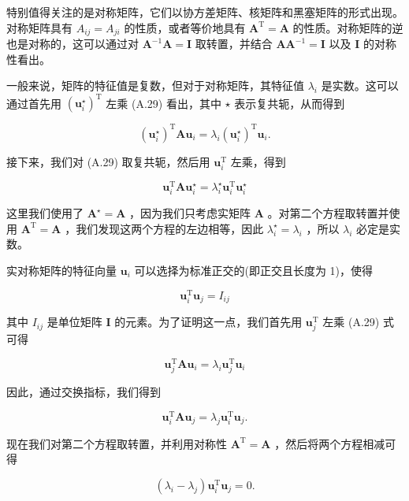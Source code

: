 \documentclass[10pt]{article}
\begin{document}
特别值得关注的是对称矩阵，它们以协方差矩阵、核矩阵和黑塞矩阵的形式出现。对称矩阵具有 \({A}_{ij} = {A}_{ji}\) 的性质，或者等价地具有 \({\mathbf{A}}^{\mathrm{T}} = \mathbf{A}\) 的性质。对称矩阵的逆也是对称的，这可以通过对 \({\mathbf{A}}^{-1}\mathbf{A} = \mathbf{I}\) 取转置，并结合 \(\mathbf{A}{\mathbf{A}}^{-1} = \mathbf{I}\) 以及 \(\mathbf{I}\) 的对称性看出。

一般来说，矩阵的特征值是复数，但对于对称矩阵，其特征值 \({\lambda }_{i}\) 是实数。这可以通过首先用 \({\left( {\mathbf{u}}_{i}^{ \star  }\right) }^{\mathrm{T}}\) 左乘 (A.29) 看出，其中 \(\star\) 表示复共轭，从而得到

\[
{\left( {\mathbf{u}}_{i}^{ \star  }\right) }^{\mathrm{T}}\mathbf{A}{\mathbf{u}}_{i} = {\lambda }_{i}{\left( {\mathbf{u}}_{i}^{ \star  }\right) }^{\mathrm{T}}{\mathbf{u}}_{i}. \tag{A.31}
\]

接下来，我们对 (A.29) 取复共轭，然后用 \({\mathbf{u}}_{i}^{\mathrm{T}}\) 左乘，得到

\[
{\mathbf{u}}_{i}^{\mathrm{T}}\mathbf{A}{\mathbf{u}}_{i}^{ \star  } = {\lambda }_{i}^{ \star  }{\mathbf{u}}_{i}^{\mathrm{T}}{\mathbf{u}}_{i}^{ \star  } \tag{A.32}
\]

这里我们使用了 \({\mathbf{A}}^{ \star  } = \mathbf{A}\) ，因为我们只考虑实矩阵 \(\mathbf{A}\) 。对第二个方程取转置并使用 \({\mathbf{A}}^{\mathrm{T}} = \mathbf{A}\) ，我们发现这两个方程的左边相等，因此 \({\lambda }_{i}^{ \star  } = {\lambda }_{i}\) ，所以 \({\lambda }_{i}\) 必定是实数。

实对称矩阵的特征向量 \({\mathbf{u}}_{i}\) 可以选择为标准正交的(即正交且长度为 1)，使得

\[
{\mathbf{u}}_{i}^{\mathrm{T}}{\mathbf{u}}_{j} = {I}_{ij} \tag{A.33}
\]

其中 \({I}_{ij}\) 是单位矩阵 \(\mathbf{I}\) 的元素。为了证明这一点，我们首先用 \({\mathbf{u}}_{j}^{\mathrm{T}}\) 左乘 (A.29) 式可得

\[
{\mathbf{u}}_{j}^{\mathrm{T}}\mathbf{A}{\mathbf{u}}_{i} = {\lambda }_{i}{\mathbf{u}}_{j}^{\mathrm{T}}{\mathbf{u}}_{i} \tag{A.34}
\]

因此，通过交换指标，我们得到

\[
{\mathbf{u}}_{i}^{\mathrm{T}}\mathbf{A}{\mathbf{u}}_{j} = {\lambda }_{j}{\mathbf{u}}_{i}^{\mathrm{T}}{\mathbf{u}}_{j}. \tag{A.35}
\]

现在我们对第二个方程取转置，并利用对称性 \({\mathbf{A}}^{\mathrm{T}} = \mathbf{A}\) ，然后将两个方程相减可得

\[
\left( {{\lambda }_{i} - {\lambda }_{j}}\right) {\mathbf{u}}_{i}^{\mathrm{T}}{\mathbf{u}}_{j} = 0. \tag{A.36}
\]
\end{document}
